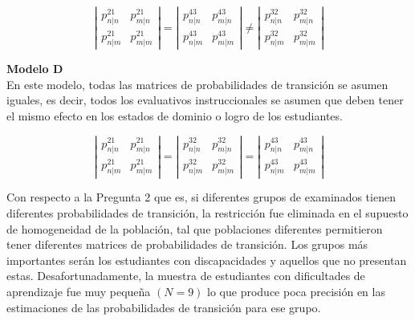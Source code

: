 $$\left|\begin{array}
{cc}{p_{n | n}^{21}} & {p_{m | n}^{21}} \\ {p_{n | m}^{21}} & {p_{m | m}^{21}}\end{array}\right|=\left|\begin{array}{cc}{p_{n | n}^{43}} & {p_{m | n}^{43}} \\ {p_{n | m}^{43}} & {p_{m | m}^{43}}\end{array}\right| \neq\left|\begin{array}{cc}{p_{n | n}^{32}} & {p_{m | n}^{32}} \\ {p_{n | m}^{32}} & {p_{m | m}^{32}}\end{array}\right|$$

\noindent
\textbf{Modelo D}\\
En este modelo, todas las matrices de probabilidades de transici\'{o}n se asumen iguales, es decir, todos los evaluativos instruccionales se asumen que deben tener el mismo efecto en los estados de dominio o logro de los estudiantes.

$$\left|\begin{array}
{cc}{p_{n | n}^{21}} & {p_{m | n}^{21}} \\ {p_{n | m}^{21}} & {p_{m | m}^{21}}\end{array}\right|=\left|\begin{array}{cc}{p_{n | n}^{32}} & {p_{m | n}^{32}} \\ {p_{n | m}^{32}} & {p_{m | m}^{32}}\end{array}\right|=\left|\begin{array}{cc}{p_{n | n}^{43}} & {p_{m | n}^{43}} \\ {p_{n | m}^{43}} & {p_{m | m}^{43}}\end{array}\right|$$

Con respecto a la Pregunta 2 que es, si diferentes grupos de examinados tienen diferentes probabilidades de transici\'{o}n, la restricci\'{o}n fue eliminada en el supuesto de homogeneidad de la poblaci\'{o}n, tal que poblaciones diferentes permitieron tener diferentes matrices de probabilidades de transici\'{o}n. Los grupos m\'{a}s importantes ser\'{a}n los estudiantes con discapacidades y aquellos que no presentan estas.
Desafortunadamente, la muestra de estudiantes con dificultades de aprendizaje fue muy peque\~{n}a $(N=9)$ lo que produce poca precisi\'{o}n en las estimaciones de las probabilidades de transici\'{o}n para ese grupo. 

